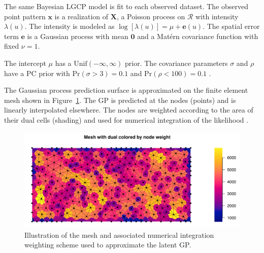 \documentclass[review]{elsarticle}
\begin{document}
The same Bayesian LGCP model is fit to each observed dataset. The observed
point pattern \(\mathbf{x}\) is a realization of \(\mathbf{X}\), a Poisson
process on \(\mathcal{R}\) with intensity \(\lambda(u)\). The intensity is
modeled as \(\log[\lambda(u)] = \mu + \mathbf{e}(u)\). The spatial error term
\(\mathbf{e}\) is a Gaussian process with mean \(\mathbf{0}\) and a
Mat\'{e}rn covariance function with fixed \(\nu = 1\).

The intercept \(\mu\) has a \(\mathrm{Unif}(-\infty, \infty)\) prior.
The covariance parameters \(\sigma\) and \(\rho\) have a PC prior with
\(\mathrm{Pr}(\sigma > 3) = 0.1\) and \(\mathrm{Pr}(\rho < 100) = 0.1\)
\citep{fuglstadetal,simpsonpc}.

The Gaussian process prediction surface is approximated on the finite element
mesh shown in Figure~\ref{meshfull}. The GP is predicted at the nodes (points)
and is linearly interpolated elsewhere. The nodes are weighted according to
the area of their dual cells (shading) and used for numerical integration of
the likelihood \citep{lindgrenetal}.

\begin{figure}
\includegraphics[width=5in]{../graphics/mesh_full.pdf}
\caption{Illustration of the mesh and associated numerical integration
weighting scheme used to approximate the latent GP.}
\label{meshfull}
\end{figure}


\end{document}
